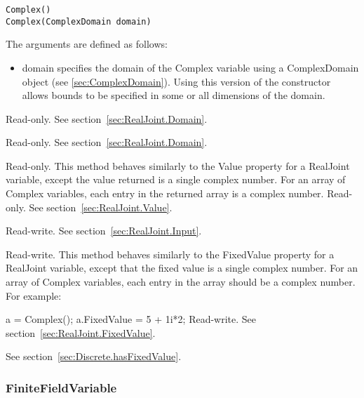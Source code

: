 \fi

\ifjava
\begin{lstlisting}
Complex()
Complex(ComplexDomain domain)
\end{lstlisting}

The arguments are defined as follows:

\begin{itemize}
\item domain specifies the domain of the Complex variable using a ComplexDomain object (see \ref{sec:ComplexDomain}).  Using this version of the constructor allows bounds to be specified in some or all dimensions of the domain.
\end{itemize}
\fi



Read-only.  See section~\ref{sec:RealJoint.Domain}.


Read-only.  See section~\ref{sec:RealJoint.Domain}.


\ifmatlab
Read-only.  This method behaves similarly to the Value property for a RealJoint variable, except the value returned is a single complex number.  For an array of Complex variables, each entry in the returned array is a complex number.
\fi
\ifjava
Read-only.  See section~\ref{sec:RealJoint.Value}.
\fi


Read-write.  See section~\ref{sec:RealJoint.Input}.


\ifmatlab
Read-write.  This method behaves similarly to the FixedValue property for a RealJoint variable, except that the fixed value is a single complex number.  For an array of Complex variables, each entry in the array should be a complex number.  For example:

a = Complex();
a.FixedValue = 5 + 1i*2;
\fi
\ifjava
Read-write.  See section~\ref{sec:RealJoint.FixedValue}.
\fi



See section~\ref{sec:Discrete.hasFixedValue}.


\subsubsection{FiniteFieldVariable}

